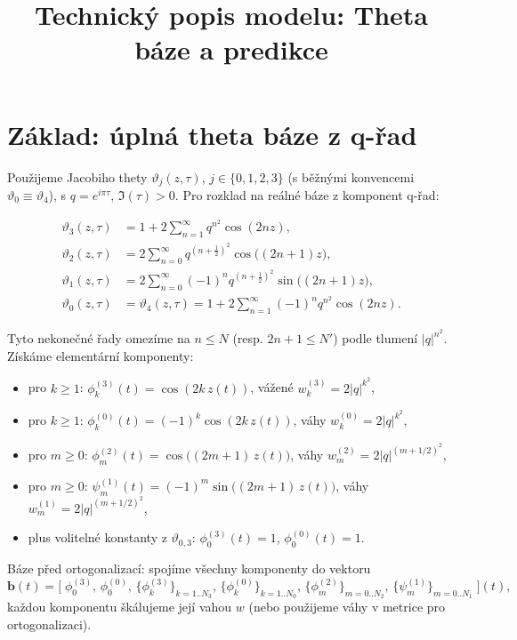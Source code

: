 \documentclass[12pt, a4paper]{article}
\title{Technický popis modelu: Theta báze a predikce}
\author{}
\date{}
\begin{document}
\maketitle

\section{Základ: úplná theta báze z q-řad}

Použijeme Jacobiho thety $\vartheta_j(z,\tau)$, $j \in \{0,1,2,3\}$ (s běžnými konvencemi $\vartheta_0 \equiv \vartheta_4$), s $q = e^{i\pi\tau}$, $\Im(\tau)>0$. Pro rozklad na reálné báze z komponent q-řad:

\begin{align*}
\vartheta_3(z,\tau) &= 1 + 2\sum_{n=1}^\infty q^{n^2}\cos(2n z),\\
\vartheta_2(z,\tau) &= 2\sum_{n=0}^\infty q^{(n+\frac{1}{2})^2}\cos\big((2n+1)z\big),\\
\vartheta_1(z,\tau) &= 2\sum_{n=0}^\infty (-1)^n q^{(n+\frac{1}{2})^2}\sin\big((2n+1)z\big),\\
\vartheta_0(z,\tau) &= \vartheta_4(z,\tau) = 1 + 2\sum_{n=1}^\infty (-1)^n q^{n^2}\cos(2n z).
\end{align*}

Tyto nekonečné řady omezíme na $n \le N$ (resp. $2n+1 \le N'$) podle tlumení $|q|^{n^2}$. Získáme elementární komponenty:
\begin{itemize}
    \item pro $k \ge 1$: $\phi^{(3)}_{k}(t) = \cos(2k\, z(t))$, vážené $w^{(3)}_k = 2|q|^{k^2}$,
    \item pro $k \ge 1$: $\phi^{(0)}_{k}(t) = (-1)^k \cos(2k\, z(t))$, váhy $w^{(0)}_k = 2|q|^{k^2}$,
    \item pro $m \ge 0$: $\phi^{(2)}_{m}(t) = \cos\big((2m+1)\, z(t)\big)$, váhy $w^{(2)}_m = 2|q|^{(m+1/2)^2}$,
    \item pro $m \ge 0$: $\psi^{(1)}_{m}(t) = (-1)^m \sin\big((2m+1)\, z(t)\big)$, váhy $w^{(1)}_m = 2|q|^{(m+1/2)^2}$,
    \item plus volitelné konstanty z $\vartheta_{0,3}$: $\phi^{(3)}_0(t)=1$, $\phi^{(0)}_0(t)=1$.
\end{itemize}

Báze před ortogonalizací: spojíme všechny komponenty do vektoru
$$
\mathbf{b}(t) = \big[\;\phi^{(3)}_0,\, \phi^{(0)}_0,\, \{\phi^{(3)}_k\}_{k=1..N_3},\, \{\phi^{(0)}_k\}_{k=1..N_0},\, \{\phi^{(2)}_m\}_{m=0..N_2},\, \{\psi^{(1)}_m\}_{m=0..N_1}\;\big](t),
$$
každou komponentu škálujeme její vahou $w$ (nebo použijeme váhy v metrice pro ortogonalizaci).
\end{document}
